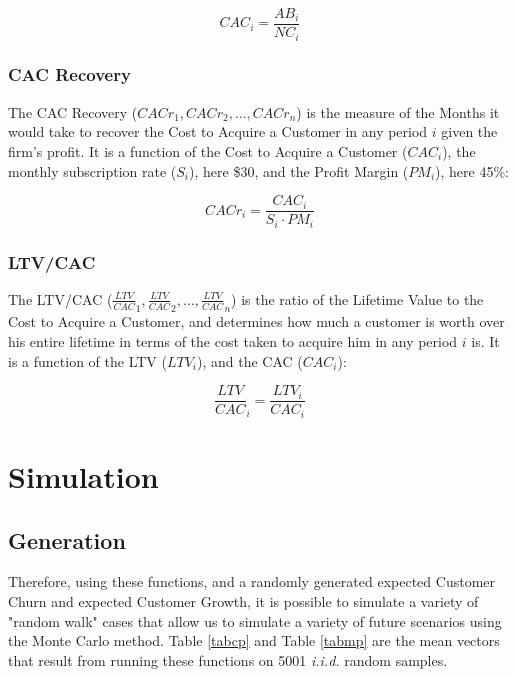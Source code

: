 \documentclass[11pt]{article}
\begin{document}
\[
CAC_{i} = \frac{AB_{i}}{NC_{i}}
\]


\subsubsection*{CAC Recovery}

The CAC Recovery ($CACr_{1}, CACr_{2}, \ldots, CACr_{n}$) is the measure of the Months it would take to recover the Cost to Acquire a Customer in any period $i$  given the firm's profit. It is a function of the Cost to Acquire a Customer ($CAC_{i}$), the monthly subscription rate ($S_{i}$), here \$30, and the Profit Margin ($PM_{i}$), here 45\%:


\[
CACr_{i} = \frac{CAC_{i}}{S_{i} \cdot PM_{i}}
\]

\subsubsection*{LTV/CAC}

The LTV/CAC ($\frac{LTV}{CAC}_{1}, \frac{LTV}{CAC}_{2}, \ldots, \frac{LTV}{CAC}_{n}$) is the ratio of the Lifetime Value to the Cost to Acquire a Customer, and determines how much a customer is worth over his entire lifetime in terms of the cost taken to acquire him in any period $i$  is. It is a function of the LTV ($LTV_{i}$), and the CAC ($CAC_{i}$):


\[
\frac{LTV}{CAC}_{i} = \frac{LTV_{i}}{CAC_{i}}
\]

\newpage

\section*{Simulation}

\subsection*{Generation}

Therefore, using these functions, and a randomly generated expected Customer Churn and expected Customer Growth, it is possible to simulate a variety of "random walk" cases that allow us to simulate a variety of future scenarios using the Monte Carlo method. Table \ref{tabcp} and  Table \ref{tabmp} are the mean vectors that result from running these functions on 5001 \textit{i.i.d.} random samples. 
\end{document}
